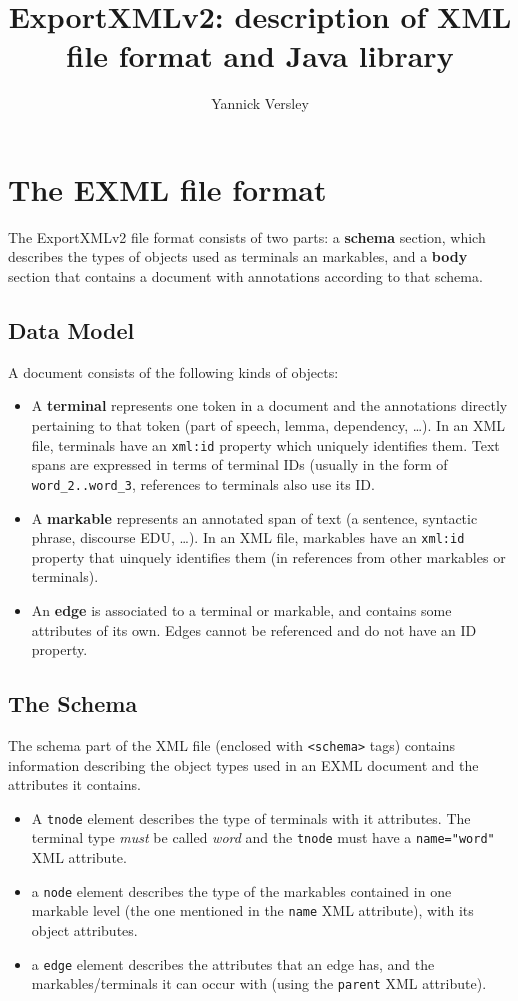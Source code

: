 \documentclass[a4paper,11pt]{report}
\title{ExportXMLv2: description of XML file format and Java library}
\author{Yannick Versley}
\date{}
\begin{document}
\maketitle

\chapter{The EXML file format}
The ExportXMLv2 file format consists of two parts: a \textbf{schema} section,
which describes the types of objects used as terminals an markables, and
a \textbf{body} section that contains a document with annotations according to
that schema.

\section{Data Model}
A document consists of the following kinds of objects:

\begin{itemize}
\item A \textbf{terminal} represents one token in a document and the annotations
directly pertaining to that token (part of speech, lemma, dependency, \dots).
In an XML file, terminals have an \texttt{xml:id} property which uniquely identifies
them. Text spans are expressed in terms of terminal IDs (usually in the form of
\texttt{word\_2..word\_3}, references to terminals also use its ID.
\item A \textbf{markable} represents an annotated span of text (a sentence, syntactic phrase,
discourse EDU, \dots). In an XML file, markables have an \texttt{xml:id} property
that uinquely identifies them (in references from other markables or terminals).
\item An \textbf{edge} is associated to a terminal or markable, and contains
some attributes of its own. Edges cannot be referenced and do not have an ID property.
\end{itemize}


\section{The Schema}
The schema part of the XML file (enclosed with \texttt{<schema>} tags)
contains information describing the object types used in an EXML document
and the attributes it contains.

\begin{itemize}
\item A \texttt{tnode} element describes the type of terminals with it attributes.
The terminal type \emph{must} be called \emph{word} and the \texttt{tnode}
must have a \texttt{name="word"} XML attribute.
\item a \texttt{node} element describes the type of the markables contained
in one markable level (the one mentioned in the \texttt{name} XML attribute),
with its object attributes.
\item a \texttt{edge} element describes the attributes that an edge has,
and the markables/terminals it can occur with (using the \texttt{parent}
XML attribute).
\end{itemize}
\end{document}
